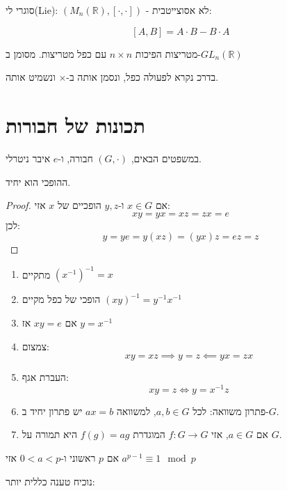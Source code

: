 \documentclass{tstextbook}
\begin{document}
\begin{example}
סוגרי לי(Lie): \((M_{n}(\mathbb{R}),[\cdot,\cdot])\) - לא אסוצייטבית:

$$[A,B]=A\cdot B-B\cdot A$$

\end{example}
\begin{example}
מטריצות הפיכות \(n\times n\) עם כפל מטריצות. מסומן ב-\(GL_{n}(\mathbb{R})\)

\end{example}
\begin{remark}
בדרכ נקרא לפעולה כפל, ונסמן אותה ב-\(\times\) ונשמיט אותה. 

\end{remark}
\section{תכונות של חבורות}

במשפטים הבאים, \((G,\cdot)\) חבורה, ו-\(e\) איבר ניטרלי.

\begin{proposition}
ההופכי הוא יחיד.

\end{proposition}
\begin{proof}
אם \(x \in G\) ו-\(y,z\) הופכיים של \(x\) אזי:
$$xy=yx=xz=zx=e$$
לכן:
$$y=ye=y(xz)=(yx)z=ez=z$$

\end{proof}
\begin{proposition}
  \begin{enumerate}
    \item מתקיים \((x^{-1})^{-1}=x\)


    \item הופכי של כפל מקיים \((xy)^{-1}=y^{-1}x ^{-1}\)


    \item אם \(xy=e\) אז \(y=x ^{-1}\)


    \item צמצום:\\
$$xy=xz\implies y=z \impliedby yx=zx$$


    \item העברת אגף:\\
$$xy=z\iff y=x ^{-1}z$$


    \item פתרון משוואה: לכל \(a,b\in G\), למשוואה \(ax=b\) יש פתרון יחיד ב-\(G\). 


    \item אם \(a\in G\), אזי \(f:G\to G\) המוגדרת \(f(g)=ag\) היא תמורה על \(G\). 


  \end{enumerate}
\end{proposition}
\begin{theorem}[פרמה]
אם \(p\) ראשוני ו-\(0<a <p\) אזי \(a^{p-1}\equiv 1\mod p\)

\end{theorem}
נוכיח טענה כללית יותר:
\end{document}
